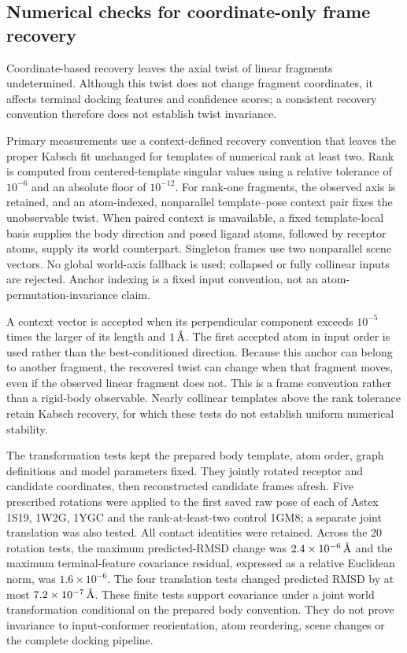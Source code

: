 \documentclass{article}
\newcommand{\angstrom}{\text{\normalfont\AA}}
\begin{document}
\subsection{Numerical checks for coordinate-only frame recovery}
\label{si:frame_recovery_checks}

Coordinate-based recovery leaves the axial twist of linear fragments undetermined. Although this twist does not change fragment coordinates, it affects terminal docking features and confidence scores; a consistent recovery convention therefore does not establish twist invariance.

Primary measurements use a context-defined recovery convention that leaves the proper Kabsch fit unchanged for templates of numerical rank at least two. Rank is computed from centered-template singular values using a relative tolerance of $10^{-6}$ and an absolute floor of $10^{-12}$. For rank-one fragments, the observed axis is retained, and an atom-indexed, nonparallel template--pose context pair fixes the unobservable twist. When paired context is unavailable, a fixed template-local basis supplies the body direction and posed ligand atoms, followed by receptor atoms, supply its world counterpart. Singleton frames use two nonparallel scene vectors. No global world-axis fallback is used; collapsed or fully collinear inputs are rejected. Anchor indexing is a fixed input convention, not an atom-permutation-invariance claim.

A context vector is accepted when its perpendicular component exceeds $10^{-5}$ times the larger of its length and $1\,\angstrom$. The first accepted atom in input order is used rather than the best-conditioned direction. Because this anchor can belong to another fragment, the recovered twist can change when that fragment moves, even if the observed linear fragment does not. This is a frame convention rather than a rigid-body observable. Nearly collinear templates above the rank tolerance retain Kabsch recovery, for which these tests do not establish uniform numerical stability.

The transformation tests kept the prepared body template, atom order, graph definitions and model parameters fixed. They jointly rotated receptor and candidate coordinates, then reconstructed candidate frames afresh. Five prescribed rotations were applied to the first saved raw pose of each of Astex 1S19, 1W2G, 1YGC and the rank-at-least-two control 1GM8; a separate joint translation was also tested. All contact identities were retained. Across the 20 rotation tests, the maximum predicted-RMSD change was $2.4\times10^{-6}\,\angstrom$ and the maximum terminal-feature covariance residual, expressed as a relative Euclidean norm, was $1.6\times10^{-6}$. The four translation tests changed predicted RMSD by at most $7.2\times10^{-7}\,\angstrom$. These finite tests support covariance under a joint world transformation conditional on the prepared body convention. They do not prove invariance to input-conformer reorientation, atom reordering, scene changes or the complete docking pipeline.
\end{document}
